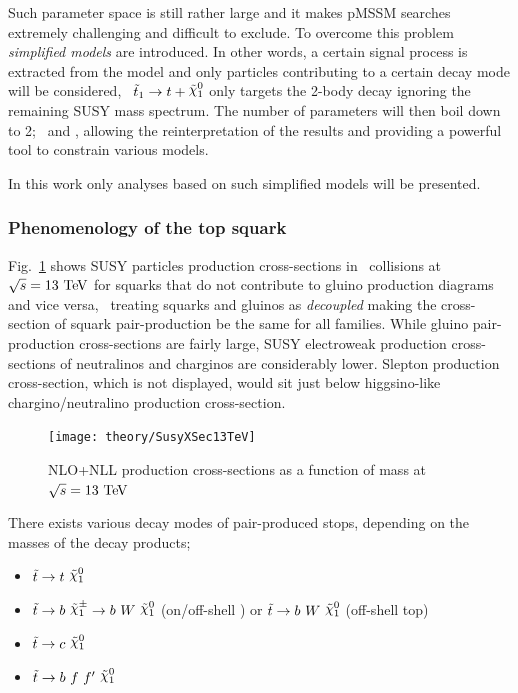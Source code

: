 				\noindent Such parameter space is still rather large and it makes pMSSM searches extremely challenging and difficult to exclude. To overcome this problem \textit{simplified models} are introduced. In other words, a certain signal process is extracted from the model and only particles contributing to a certain decay mode will be considered, \eg\ $\stopone \ra t + \ninoone$ only targets the 2-body decay ignoring the remaining SUSY mass spectrum. The number of parameters will then boil down to 2; \mstop\ and \mLSP, allowing the reinterpretation of the results and providing a powerful tool to constrain various models. 

				In this work only analyses based on such simplified models will be presented. 

			\subsubsection*{Phenomenology of the top squark}

				Fig.~\ref{fig:susy_13TeV_xsec} shows SUSY particles production cross-sections in \pp\ collisions at $\sqrt{s} = 13 \TeV$ for squarks that do not contribute to gluino production diagrams and vice versa, \ie\ treating squarks and gluinos as \textit{decoupled} making the cross-section of squark pair-production be the same for all families. While gluino pair-production cross-sections are fairly large, SUSY electroweak production cross-sections of neutralinos and charginos are considerably lower. Slepton production cross-section, which is not displayed, would sit just below higgsino-like chargino/neutralino production cross-section. 

				\begin{figure}[!htb]
					\centering
					\texttt{[image: theory/SusyXSec13TeV]}
					\caption{\label{fig:susy_13TeV_xsec} NLO+NLL production cross-sections as a function of mass at $\sqrt{s} = 13 \TeV$~\cite{Borschensky:2014cia}}
				\end{figure}

				There exists various decay modes of pair-produced stops, depending on the masses of the decay products; 

				\begin{itemize}
					\item $\stop \ra t\ \ninoone$
					\item $\stop \ra b\ \chinoonepm \ra b\  W\  \ninoone$ (on/off-shell \Wboson) or $\stop \ra b\  W\  \ninoone$ (off-shell top)
					\item $\stop \ra c\ \ninoone$
					\item $\stop \ra b\ f\ f'\ \ninoone$
				\end{itemize} 

